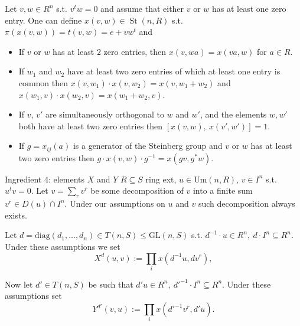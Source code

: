 \documentclass{beamer} %
\DeclareMathOperator{\St}{St}
\theoremstyle{definition}
\begin{document}
\begin{frame}
\begin{lemma}
\label{lem:xsmall-properties}
Let $v, w \in R^n$ s.t. $v^t w = 0$ and assume that either $v$ or $w$ has at least one zero entry.
One can define $x(v, w) \in \St(n, R)$ s.t. $\pi(x(v, w)) = t(v, w) = e + vw^t$ and
\begin{itemize}
\pause \item If $v$ or $w$ has at least $2$ zero entries, then $x(v, wa) = x(va, w)$ for $a\in R$.
\pause \item If $w_1$ and $w_2$ have at least two zero entries of which at least one entry is common
then $x(v, w_1) \cdot x(v, w_2) = x(v, w_1+w_2)$ and $x(w_1, v) \cdot x(w_2, v) = x(w_1 + w_2, v)$.
\pause \item If $v$, $v'$ are simultaneously orthogonal to $w$ and $w'$, and the elements $w, w'$ both have at least two zero entries then
$[x(v, w),\ x(v', w')] = 1$.
\pause \item If $g = x_{ij}(a)$ is a generator of the Steinberg group and $v$ or $w$ has at least two zero entries then
$g \cdot x(v, w) \cdot g^{-1} = x(gv, g^*w)$.
\end{itemize}
\end{lemma}
\end{frame}


\begin{frame}{Ingredient 4: elements $X$ and $Y$}
$R \subseteq S$ ring ext, 
$u \in \mathrm{Um}(n, R)$, $v \in I^n$ s.t. $u^{t}v = 0$.
Let $v = \sum_r v^r$ be some decomposition of $v$ into a finite sum $v^r \in D(u) \cap I^n$.
Under our assumptions on $u$ and $v$ such decomposition always exists.

\pause Let $d = \mathrm{diag}(d_1, \ldots, d_n) \in T(n, S) \leq \mathrm{GL}(n, S)$ s.t.
$d^{-1} \cdot u \in R^n,\ d \cdot I^n \subseteq R^n.$
Under these assumptions we set
\begin{equation*} X^d(u, v) :=\prod_i x(d^{-1}u, dv^r), \end{equation*}

\pause Now let $d' \in T(n, S)$ be such that $d' u\in R^n,\ {d'}^{-1} \cdot I^n \subseteq R^n$.
Under these assumptions set
\begin{equation*} Y^{d'}(v, u) := \prod_i x({d'}^{-1} v^r, {d'}u). \end{equation*}
\end{frame}
\end{document}
